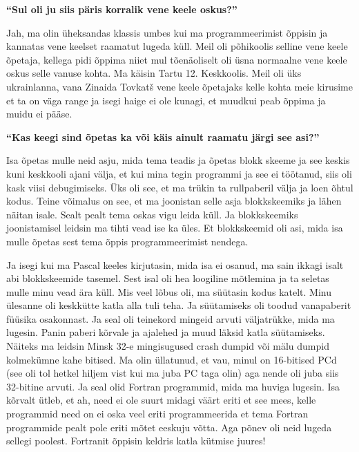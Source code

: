 \textbf{\enquote{Sul oli ju siis päris korralik vene keele oskus?}}

Jah, ma olin üheksandas klassis umbes kui ma programmeerimist õppisin ja kannatas vene keelset raamatut lugeda küll. Meil oli põhikoolis selline vene keele õpetaja, kellega pidi õppima niiet mul tõenäoliselt oli üsna normaalne vene keele oskus selle vanuse kohta. Ma käisin Tartu 12. Keskkoolis. Meil oli üks ukrainlanna, vana Zinaida Tovkatš vene keele õpetajaks kelle kohta meie kirusime et ta on väga range ja isegi haige ei ole kunagi, et muudkui peab õppima ja muidu ei pääse. 

\textbf{\enquote{Kas keegi sind õpetas ka või käis ainult raamatu järgi see asi?}}

Isa õpetas mulle neid asju, mida tema teadis ja õpetas blokk skeeme ja see keskis kuni keskkooli ajani välja, et kui mina tegin programmi ja see ei töötanud, siis oli kask viisi debugimiseks. Üks oli see, et ma trükin ta rullpaberil välja ja loen õhtul kodus. Teine võimalus on see, et ma joonistan selle asja blokkskeemiks ja lähen näitan isale. Sealt pealt tema oskas vigu leida küll. Ja blokkskeemiks joonistamisel leidsin ma tihti vead ise ka üles. Et blokkskeemid oli asi, mida isa mulle õpetas sest tema õppis programmeerimist nendega. 

Ja isegi kui ma Pascal keeles kirjutasin, mida isa ei osanud, ma sain ikkagi isalt abi blokkskeemide tasemel. Sest isal oli hea loogiline mõtlemina ja ta seletas mulle minu vead ära küll. Mis veel lõbus oli, ma süütasin kodus katelt. Minu ülesanne oli keskkütte katla alla tuli teha. Ja süütamiseks oli toodud vanapaberit füüsika osakonnast. Ja seal oli teinekord mingeid arvuti väljatrükke, mida ma lugesin. Panin paberi kõrvale ja ajalehed ja muud läksid katla süütamiseks. Näiteks ma leidsin Minsk 32-e mingisugused crash dumpid või mälu dumpid kolmekümne kahe bitised. Ma olin üllatunud, et vau, minul on 16-bitised PCd (see oli tol hetkel hiljem vist kui ma juba PC taga olin) aga nende oli juba siis 32-bitine arvuti. Ja seal olid Fortran programmid, mida ma huviga lugesin. Isa kõrvalt ütleb, et ah, need ei ole suurt midagi väärt eriti et see mees, kelle programmid need on ei oska veel eriti programmeerida et tema Fortran programmide pealt pole eriti mõtet eeskuju võtta. Aga põnev oli neid lugeda sellegi poolest. Fortranit õppisin keldris katla kütmise juures!

